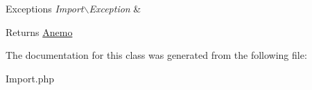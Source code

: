 \begin{DoxyExceptions}{Exceptions}
{\em Import$\backslash$Exception} & \\
\hline
\end{DoxyExceptions}
\begin{DoxyReturn}{Returns}
\hyperlink{namespace_anemo}{Anemo} 
\end{DoxyReturn}


The documentation for this class was generated from the following file:\begin{DoxyCompactItemize}
\item 
Import.php\end{DoxyCompactItemize}
